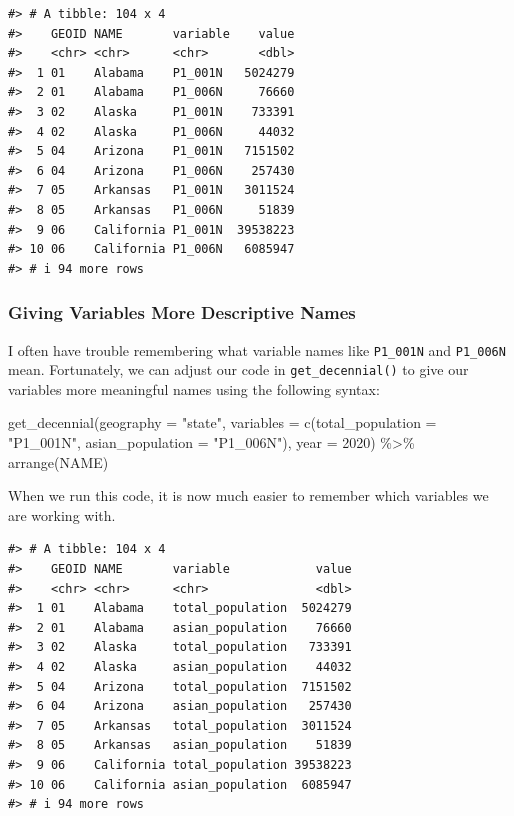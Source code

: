 \documentclass[
]{book}
\newenvironment{Shaded}{\begin{snugshade}}{\end{snugshade}}
\newcommand{\AttributeTok}[1]{\textcolor[rgb]{0.77,0.63,0.00}{#1}}
\newcommand{\DecValTok}[1]{\textcolor[rgb]{0.00,0.00,0.81}{#1}}
\newcommand{\FunctionTok}[1]{\textcolor[rgb]{0.00,0.00,0.00}{#1}}
\newcommand{\NormalTok}[1]{#1}
\newcommand{\SpecialCharTok}[1]{\textcolor[rgb]{0.00,0.00,0.00}{#1}}
\newcommand{\StringTok}[1]{\textcolor[rgb]{0.31,0.60,0.02}{#1}}
\begin{document}
\begin{verbatim}
#> # A tibble: 104 x 4
#>    GEOID NAME       variable    value
#>    <chr> <chr>      <chr>       <dbl>
#>  1 01    Alabama    P1_001N   5024279
#>  2 01    Alabama    P1_006N     76660
#>  3 02    Alaska     P1_001N    733391
#>  4 02    Alaska     P1_006N     44032
#>  5 04    Arizona    P1_001N   7151502
#>  6 04    Arizona    P1_006N    257430
#>  7 05    Arkansas   P1_001N   3011524
#>  8 05    Arkansas   P1_006N     51839
#>  9 06    California P1_001N  39538223
#> 10 06    California P1_006N   6085947
#> # i 94 more rows
\end{verbatim}

\hypertarget{giving-variables-more-descriptive-names}{%
\subsubsection*{Giving Variables More Descriptive Names}\label{giving-variables-more-descriptive-names}}

I often have trouble remembering what variable names like \texttt{P1\_001N} and \texttt{P1\_006N} mean. Fortunately, we can adjust our code in \texttt{get\_decennial()} to give our variables more meaningful names using the following syntax:

\begin{Shaded}
\begin{Highlighting}[]
\FunctionTok{get\_decennial}\NormalTok{(}\AttributeTok{geography =} \StringTok{"state"}\NormalTok{, }
              \AttributeTok{variables =} \FunctionTok{c}\NormalTok{(}\AttributeTok{total\_population =} \StringTok{"P1\_001N"}\NormalTok{, }
                            \AttributeTok{asian\_population =} \StringTok{"P1\_006N"}\NormalTok{),}
              \AttributeTok{year =} \DecValTok{2020}\NormalTok{) }\SpecialCharTok{\%\textgreater{}\%} 
  \FunctionTok{arrange}\NormalTok{(NAME)}
\end{Highlighting}
\end{Shaded}

When we run this code, it is now much easier to remember which variables we are working with.

\begin{verbatim}
#> # A tibble: 104 x 4
#>    GEOID NAME       variable            value
#>    <chr> <chr>      <chr>               <dbl>
#>  1 01    Alabama    total_population  5024279
#>  2 01    Alabama    asian_population    76660
#>  3 02    Alaska     total_population   733391
#>  4 02    Alaska     asian_population    44032
#>  5 04    Arizona    total_population  7151502
#>  6 04    Arizona    asian_population   257430
#>  7 05    Arkansas   total_population  3011524
#>  8 05    Arkansas   asian_population    51839
#>  9 06    California total_population 39538223
#> 10 06    California asian_population  6085947
#> # i 94 more rows
\end{verbatim}
\end{document}
